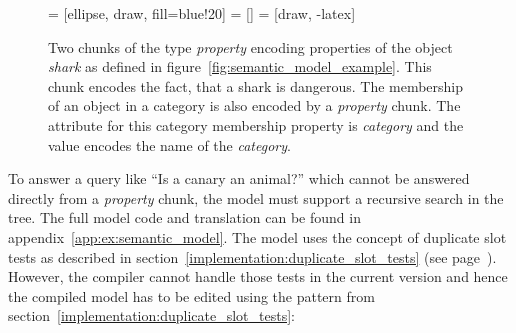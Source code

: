 \begin{figure}[htb]
\centering
{} = [ellipse, draw, fill=blue!20]
 = [] 
 = [draw, -latex]   
\qquad
{}
\caption{Two chunks of the type \emph{property} encoding properties of the object \emph{shark} as defined in figure~\ref{fig:semantic_model_example}.  This chunk encodes the fact, that a shark is dangerous.  The membership of an object in a category is also encoded by a \emph{property} chunk. The attribute for this category membership property is \emph{category} and the value encodes the name of the \emph{category}.}
\label{fig:semantic_model_example:chunks}
\end{figure}


To answer a query like ``Is a canary an animal?'' which cannot be answered directly from a \emph{property} chunk, the model must support a recursive search in the tree. The full model code and translation can be found in appendix~\ref{app:ex:semantic_model}. The model uses the concept of duplicate slot tests as described in section~\ref{implementation:duplicate_slot_tests} (see page~\pageref{implementation:duplicate_slot_tests}). However, the compiler cannot handle those tests in the current version and hence the compiled model has to be edited using the pattern from section~\ref{implementation:duplicate_slot_tests}:
\enlargethispage{-\baselineskip}

